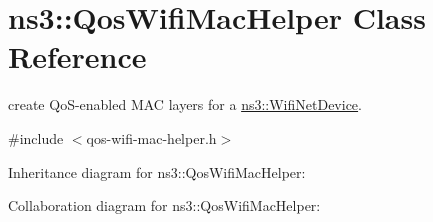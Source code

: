 \hypertarget{classns3_1_1QosWifiMacHelper}{}\section{ns3\+:\+:Qos\+Wifi\+Mac\+Helper Class Reference}
\label{classns3_1_1QosWifiMacHelper}


create Qo\+S-\/enabled M\+AC layers for a \hyperlink{classns3_1_1WifiNetDevice}{ns3\+::\+Wifi\+Net\+Device}.  




{\ttfamily \#include $<$qos-\/wifi-\/mac-\/helper.\+h$>$}



Inheritance diagram for ns3\+:\+:Qos\+Wifi\+Mac\+Helper\+:


Collaboration diagram for ns3\+:\+:Qos\+Wifi\+Mac\+Helper\+:

